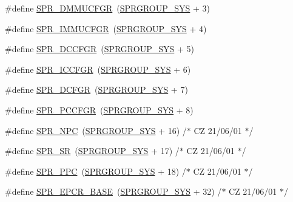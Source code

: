 \begin{DoxyCompactItemize}
\item 
\#define \hyperlink{spr-defs_8h_a8d85198f3f6402c8813c82fc54c02454}{\-S\-P\-R\-\_\-\-D\-M\-M\-U\-C\-F\-G\-R}~(\hyperlink{spr-defs_8h_a5fa75eea4be01ea7e7fb6804ab4b2774}{\-S\-P\-R\-G\-R\-O\-U\-P\-\_\-\-S\-Y\-S} + 3)
\item 
\#define \hyperlink{spr-defs_8h_a586eb18cd5407b9c9e4ee92a0973e43a}{\-S\-P\-R\-\_\-\-I\-M\-M\-U\-C\-F\-G\-R}~(\hyperlink{spr-defs_8h_a5fa75eea4be01ea7e7fb6804ab4b2774}{\-S\-P\-R\-G\-R\-O\-U\-P\-\_\-\-S\-Y\-S} + 4)
\item 
\#define \hyperlink{spr-defs_8h_a01be9a913c65a76a2b755ad8890c84f2}{\-S\-P\-R\-\_\-\-D\-C\-C\-F\-G\-R}~(\hyperlink{spr-defs_8h_a5fa75eea4be01ea7e7fb6804ab4b2774}{\-S\-P\-R\-G\-R\-O\-U\-P\-\_\-\-S\-Y\-S} + 5)
\item 
\#define \hyperlink{spr-defs_8h_a2daf762d8cbec792365937f683b86c6d}{\-S\-P\-R\-\_\-\-I\-C\-C\-F\-G\-R}~(\hyperlink{spr-defs_8h_a5fa75eea4be01ea7e7fb6804ab4b2774}{\-S\-P\-R\-G\-R\-O\-U\-P\-\_\-\-S\-Y\-S} + 6)
\item 
\#define \hyperlink{spr-defs_8h_a0e212b6035416783fb12185976673885}{\-S\-P\-R\-\_\-\-D\-C\-F\-G\-R}~(\hyperlink{spr-defs_8h_a5fa75eea4be01ea7e7fb6804ab4b2774}{\-S\-P\-R\-G\-R\-O\-U\-P\-\_\-\-S\-Y\-S} + 7)
\item 
\#define \hyperlink{spr-defs_8h_aa2c8a42361c1e078344d0ca7e0f5a118}{\-S\-P\-R\-\_\-\-P\-C\-C\-F\-G\-R}~(\hyperlink{spr-defs_8h_a5fa75eea4be01ea7e7fb6804ab4b2774}{\-S\-P\-R\-G\-R\-O\-U\-P\-\_\-\-S\-Y\-S} + 8)
\item 
\#define \hyperlink{spr-defs_8h_ac5e87be4d83286ca304bc82ac28dd4d8}{\-S\-P\-R\-\_\-\-N\-P\-C}~(\hyperlink{spr-defs_8h_a5fa75eea4be01ea7e7fb6804ab4b2774}{\-S\-P\-R\-G\-R\-O\-U\-P\-\_\-\-S\-Y\-S} + 16)  /$\ast$ \-C\-Z 21/06/01 $\ast$/
\item 
\#define \hyperlink{spr-defs_8h_a4580bfb89115ee6be7947e9ee7b59ba0}{\-S\-P\-R\-\_\-\-S\-R}~(\hyperlink{spr-defs_8h_a5fa75eea4be01ea7e7fb6804ab4b2774}{\-S\-P\-R\-G\-R\-O\-U\-P\-\_\-\-S\-Y\-S} + 17)  /$\ast$ \-C\-Z 21/06/01 $\ast$/
\item 
\#define \hyperlink{spr-defs_8h_ab0664a45fdaf01fcf6dc864965c4c4c6}{\-S\-P\-R\-\_\-\-P\-P\-C}~(\hyperlink{spr-defs_8h_a5fa75eea4be01ea7e7fb6804ab4b2774}{\-S\-P\-R\-G\-R\-O\-U\-P\-\_\-\-S\-Y\-S} + 18)  /$\ast$ \-C\-Z 21/06/01 $\ast$/
\item 
\#define \hyperlink{spr-defs_8h_a2039cac688376d90ae733d8830230727}{\-S\-P\-R\-\_\-\-E\-P\-C\-R\-\_\-\-B\-A\-S\-E}~(\hyperlink{spr-defs_8h_a5fa75eea4be01ea7e7fb6804ab4b2774}{\-S\-P\-R\-G\-R\-O\-U\-P\-\_\-\-S\-Y\-S} + 32)  /$\ast$ \-C\-Z 21/06/01 $\ast$/

\end{DoxyCompactItemize}
